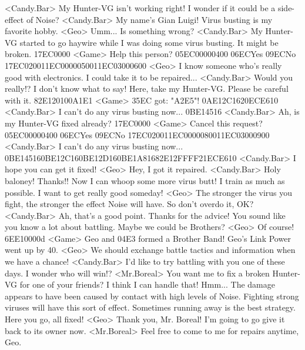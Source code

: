 <Candy.Bar> My Hunter-VG isn't working right! I wonder if it could be a side-effect of Noise? 
<Candy.Bar> My name's Gian Luigi! 
Virus busting is my favorite hobby. 
<Geo> Umm... Is something wrong? 
<Candy.Bar> My Hunter-VG started to go haywire while I was doing some virus busting. 
It might be broken. 
{17}{EC}{00}{00} 
<Game> Help this person? {05}{EC}{00}{00}{04}{00}  {06}{EC}Yes   {09}{EC}No 
{17}{EC}{02}{00}{11}{EC}{00}{00}{05}{00}{11}{EC}{03}{00}{06}{00}
<Geo> I know someone who's really good with electronics. I could take it to be repaired... 
<Candy.Bar> Would you really!? I don't know what to say! 
Here, take my Hunter-VG. Please be careful with it. 
{82}{E1}2{01}{00}{A1}{E1} 
<Game> {35}{EC} got: "{A2}{E5}"! 
{0A}{E1}{2C}{16}{20}{EC}{E6}{10}
<Candy.Bar> I can't do any virus busting now... 
{0B}{E1}{45}{16}
<Candy.Bar> Ah, is my Hunter-VG fixed already? 
{17}{EC}{00}{00} 
<Game> Cancel this request? {05}{EC}{00}{00}{04}{00}  {06}{EC}Yes   {09}{EC}No 
{17}{EC}{02}{00}{11}{EC}{00}{00}{08}{00}{11}{EC}{03}{00}{09}{00}
<Candy.Bar> I can't do any virus busting now... 
{0B}{E1}{45}{16}{0B}{E1}{2C}{16}{0B}{E1}{2D}{16}{0B}{E1}{A8}{16}{82}{E1}2{FF}{FF}{21}{EC}{E6}{10}
<Candy.Bar> I hope you can get it fixed! 
<Geo> Hey, I got it repaired. 
<Candy.Bar> Holy baloney! Thanks!! 
Now I can whoop some more virus butt! 
I train as much as possible. I want to get really good someday! 
<Geo> The stronger the virus you fight, the stronger the effect Noise will have. 
So don't overdo it, OK? 
<Candy.Bar> Ah, that's a good point. Thanks for the advice! 
You sound like you know a lot about battling. 
Maybe we could be Brothers? 
<Geo> Of course! 
{6E}{E1}{00}{00}d 
<Game> Geo and {04}{E3} formed a Brother Band! 
Geo's Link Power went up by 40. 
<Geo> We should exchange battle tactics and information when we have a chance! 
<Candy.Bar> I'd like to try battling with you one of these days. 
I wonder who will win!? 
<Mr.Boreal> You want me to fix a broken Hunter-VG for one of your friends? 
I think I can handle that! 
Hmm... 
The damage appears to have been caused by contact with high levels of Noise. 
Fighting strong viruses will have this sort of effect. 
Sometimes running away is the best strategy. 
Here you go, all fixed! 
<Geo> Thank you, Mr. Boreal! 
I'm going to go give it back to its owner now. 
<Mr.Boreal> Feel free to come to me for repairs anytime, Geo. 
